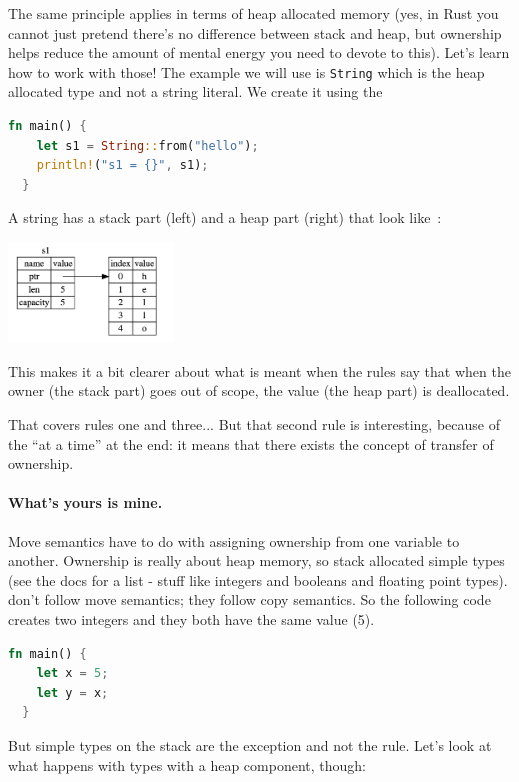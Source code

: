 \documentclass[a4paper]{report}
\begin{document}
The same principle applies in terms of heap allocated memory (yes, in Rust you cannot just pretend there's no difference between stack and heap, but ownership helps reduce the amount of mental energy you need to devote to this). Let's learn how to work with those! The example we will use is \texttt{String} which is the heap allocated type and not a string literal. We create it using the 
\begin{lstlisting}[language=Rust]
  fn main() {
    let s1 = String::from("hello");
    println!("s1 = {}", s1);
  }
\end{lstlisting}

A string has a stack part (left) and a heap part (right) that look like~\cite{rustdocs}:
\begin{center}
\includegraphics[width=0.33\textwidth]{images/string.png} 
\end{center}

This makes it a bit clearer about what is meant when the rules say that when the owner (the stack part) goes out of scope, the value (the heap part) is deallocated.

That covers rules one and three... But that second rule is interesting, because of the ``at a time'' at the end: it means that there exists the concept of transfer of ownership. 

\paragraph{What's yours is mine.}
Move semantics have to do with assigning ownership from one variable to another. Ownership is really about heap memory, so stack allocated simple types (see the docs for a list - stuff like integers and booleans and floating point types). don't follow move semantics; they follow copy semantics. So the following code creates two integers and they both have the same value (5).

\begin{lstlisting}[language=Rust]
  fn main() {
   	let x = 5;
	let y = x;
  }
\end{lstlisting}

But simple types on the stack are the exception and not the rule. Let's look at what happens with types with a heap component, though:
\end{document}
